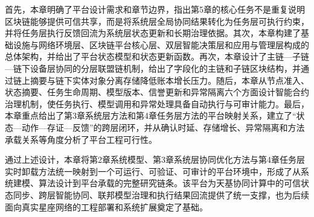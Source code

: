 首先，本章明确了平台设计需求和章节边界，指出第5章的核心任务不是重复说明区块链能够提供可信共享，而是将系统层全局协同结果转化为任务层可执行约束，并将任务层执行反馈回流为系统层状态更新和长期治理依据。其次，本章构建了基础设施与网络环境层、区块链平台核心层、双层智能决策层和应用与管理层构成的总体架构，并给出了平台状态模型和状态更新函数。再次，本章设计了主链—子链—链下设备层协同的分层联盟链机制，给出了字段化的主链和子链区块结构，并通过链上摘要与链下实体对象分离存储降低账本增长压力。随后，本章从节点准入、状态摘要、任务生命周期、模型版本、信誉更新和异常隔离六个方面设计智能合约治理机制，使任务执行、模型调用和异常处理具备自动执行与可审计能力。最后，本章重点给出了第3章系统层方法和第4章任务层方法的平台映射关系，建立了“状态—动作—存证—反馈”的跨层闭环，并从确认时延、存储增长、异常隔离和方法承载关系等角度分析了平台工程可行性。

通过上述设计，本章将第2章系统模型、第3章系统层协同优化方法与第4章任务层实时卸载方法统一映射到一个可运行、可验证、可审计的平台环境中，形成了从系统建模、算法设计到平台承载的完整研究链条。该平台为天基协同计算中的可信状态同步、跨层智能协同、联邦模型治理和执行结果回流提供了统一支撑，也为后续面向真实星座网络的工程部署和系统扩展奠定了基础。

